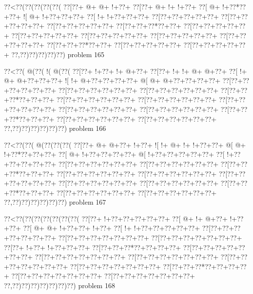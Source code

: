 \vbox{\vbox{\goo
\0??<\0??(\0??(\0??(\0??(\0??(
\0??[\0??+\- @+\- @+\- !+\0??+
\0??[\0??+\- @+\- !+\- !+\0??+
\0??[\- @+\- !+\0??*\0??+\0??+
\- ![\- @+\- !+\0??+\0??+\0??+
\0??[\- !+\- !+\0??+\0??+\0??+
\0??[\0??+\0??+\0??+\0??+\0??+
\0??[\0??+\0??+\0??+\0??+\0??+
\0??[\0??+\0??+\0??+\0??+\0??+
\0??[\0??+\0??+\0??*\0??+\0??+
\0??[\0??+\0??+\0??+\0??+\0??+
\0??[\0??+\0??+\0??+\0??+\0??+
\0??[\0??+\0??+\0??+\0??+\0??+
\0??[\0??+\0??+\0??+\0??+\0??+
\0??[\0??+\0??+\0??+\0??+\0??+
\0??[\0??+\0??+\0??*\0??+\0??+
\0??[\0??+\0??+\0??+\0??+\0??+
\0??[\0??+\0??+\0??+\0??+\0??+
\0??,\0??)\0??)\0??)\0??)\0??)
}
\hfil problem 165\hfil\break
}

\vbox{\vbox{\goo
\0??<\0??(\- @(\0??(\- !(\- @(\0??(
\0??[\0??+\- !+\0??+\- !+\- @+\0??+
\0??[\0??+\- !+\- !+\- @+\- @+\0??+
\0??[\- !+\- @+\- @+\0??+\0??+\0??+
\- ![\- !+\- @+\0??+\0??+\0??+\0??+
\- @[\- @+\- @+\0??+\0??+\0??+\0??+
\0??[\0??+\0??+\0??+\0??+\0??+\0??+
\0??[\0??+\0??+\0??+\0??+\0??+\0??+
\0??[\0??+\0??+\0??+\0??+\0??+\0??+
\0??[\0??+\0??+\0??*\0??+\0??+\0??+
\0??[\0??+\0??+\0??+\0??+\0??+\0??+
\0??[\0??+\0??+\0??+\0??+\0??+\0??+
\0??[\0??+\0??+\0??+\0??+\0??+\0??+
\0??[\0??+\0??+\0??+\0??+\0??+\0??+
\0??[\0??+\0??+\0??+\0??+\0??+\0??+
\0??[\0??+\0??+\0??*\0??+\0??+\0??+
\0??[\0??+\0??+\0??+\0??+\0??+\0??+
\0??[\0??+\0??+\0??+\0??+\0??+\0??+
\0??,\0??)\0??)\0??)\0??)\0??)\0??)
}
\hfil problem 166\hfil\break
}

\vbox{\vbox{\goo
\0??<\0??(\0??(\- @(\0??(\0??(\0??(
\0??[\0??+\- @+\- @+\0??+\- !+\0??+
\- ![\- !+\- @+\- !+\- !+\0??+\0??+
\- @[\- @+\- !+\0??*\0??+\0??+\0??+
\0??[\- @+\- !+\0??+\0??+\0??+\0??+
\- @[\- !+\0??+\0??+\0??+\0??+\0??+
\0??[\- !+\0??+\0??+\0??+\0??+\0??+
\0??[\0??+\0??+\0??+\0??+\0??+\0??+
\0??[\0??+\0??+\0??+\0??+\0??+\0??+
\0??[\0??+\0??+\0??*\0??+\0??+\0??+
\0??[\0??+\0??+\0??+\0??+\0??+\0??+
\0??[\0??+\0??+\0??+\0??+\0??+\0??+
\0??[\0??+\0??+\0??+\0??+\0??+\0??+
\0??[\0??+\0??+\0??+\0??+\0??+\0??+
\0??[\0??+\0??+\0??+\0??+\0??+\0??+
\0??[\0??+\0??+\0??*\0??+\0??+\0??+
\0??[\0??+\0??+\0??+\0??+\0??+\0??+
\0??[\0??+\0??+\0??+\0??+\0??+\0??+
\0??,\0??)\0??)\0??)\0??)\0??)\0??)
}
\hfil problem 167\hfil\break
}

\vbox{\vbox{\goo
\0??<\0??(\0??(\0??(\0??(\0??(\0??(\0??(
\0??[\0??+\- !+\0??+\0??+\0??+\0??+\0??+
\0??[\- @+\- !+\- @+\0??+\- !+\0??+\0??+
\0??[\- @+\- @+\- !+\0??+\0??+\- !+\0??+
\0??[\- !+\- !+\0??+\0??+\0??+\0??+\0??+
\0??[\0??+\0??+\0??+\0??+\0??+\0??+\0??+
\0??[\0??+\0??+\0??+\0??+\0??+\0??+\0??+
\0??[\0??+\0??+\0??+\0??+\0??+\0??+\0??+
\0??[\0??+\- !+\0??+\- !+\0??+\0??+\0??+
\0??[\0??+\0??+\0??*\0??+\0??+\0??+\0??+
\0??[\0??+\0??+\0??+\0??+\0??+\0??+\0??+
\0??[\0??+\0??+\0??+\0??+\0??+\0??+\0??+
\0??[\0??+\0??+\0??+\0??+\0??+\0??+\0??+
\0??[\0??+\0??+\0??+\0??+\0??+\0??+\0??+
\0??[\0??+\0??+\0??+\0??+\0??+\0??+\0??+
\0??[\0??+\0??+\0??*\0??+\0??+\0??+\0??+
\0??[\0??+\0??+\0??+\0??+\0??+\0??+\0??+
\0??[\0??+\0??+\0??+\0??+\0??+\0??+\0??+
\0??,\0??)\0??)\0??)\0??)\0??)\0??)\0??)
}
\hfil problem 168\hfil\break
}

